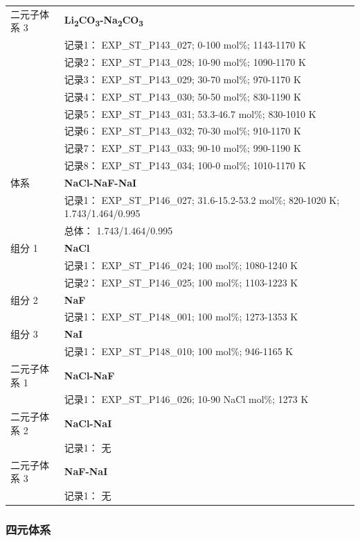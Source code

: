 \documentclass[12pt]{article}
\begin{document}
{\begin{longtable}[]{@{}
  >{\raggedright\arraybackslash}p{}
  >{\raggedright\arraybackslash}p{}@{}}
二元子体系 3  & \textbf{Li\textsubscript{2}CO\textsubscript{3}-Na\textsubscript{2}CO\textsubscript{3}} \\
 & 记录1： EXP\_ST\_P143\_027; 0-100 mol\%; 1143-1170 K \\
 & 记录2： EXP\_ST\_P143\_028; 10-90 mol\%; 1090-1170 K \\
 & 记录3： EXP\_ST\_P143\_029; 30-70 mol\%; 970-1170 K \\
 & 记录4： EXP\_ST\_P143\_030; 50-50 mol\%; 830-1190 K \\
 & 记录5： EXP\_ST\_P143\_031; 53.3-46.7 mol\%; 830-1010 K \\
 & 记录6： EXP\_ST\_P143\_032; 70-30 mol\%; 910-1170 K \\
 & 记录7： EXP\_ST\_P143\_033; 90-10 mol\%; 990-1190 K \\
 & 记录8： EXP\_ST\_P143\_034; 100-0 mol\%; 1010-1170 K  \\

\midrule
体系 & \textbf{NaCl-NaF-NaI} \\
 & 记录1： EXP\_ST\_P146\_027; 31.6-15.2-53.2 mol\%; 820-1020 K; 1.743/1.464/0.995 \\
 & 总体： 1.743/1.464/0.995  \\

组分 1  & \textbf{NaCl} \\
 & 记录1： EXP\_ST\_P146\_024; 100 mol\%; 1080-1240 K \\
 & 记录2： EXP\_ST\_P146\_025; 100 mol\%; 1103-1223 K  \\

组分 2  & \textbf{NaF} \\
 & 记录1： EXP\_ST\_P148\_001; 100 mol\%; 1273-1353 K  \\

组分 3  & \textbf{NaI} \\
 & 记录1： EXP\_ST\_P148\_010; 100 mol\%; 946-1165 K  \\

二元子体系 1  & \textbf{NaCl-NaF} \\
 & 记录1： EXP\_ST\_P146\_026; 10-90 NaCl mol\%; 1273 K  \\

二元子体系 2 & \textbf{NaCl-NaI} \\
 & 记录1： 无 \\
二元子体系 3 & \textbf{NaF-NaI} \\
 & 记录1： 无 \\
\end{longtable}
}

\subsubsection*{四元体系}\label{quaternary-system-3}
\end{document}
